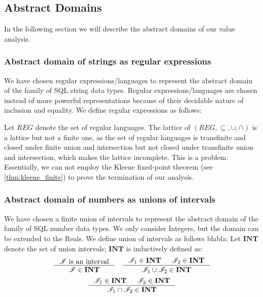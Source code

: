 \subsection{Abstract Domains}\label{subsec:abstract-domains}

In the following section we will describe the abstract domains of our value analysis.

\subsubsection{Abstract domain of strings as regular expressions}\label{subsubsec:abstract_domains_strings}
We have chosen regular expressions/languages to represent the abstract domain of the family of SQL string data types.
Regular expressions/languages are chosen instead of more powerful representations because of their decidable nature of inclusion and equality.
We define regular expressions as follows:

Let $REG$ denote the set of regular languages.
The lattice of $(REG, \subseteq, \cup, \cap)$ is a lattice but not a finite one, as the set of regular languages is transfinite and closed under finite union and intersection but not closed under transfinite union and intersection, which makes the lattice incomplete.
This is a problem: Essentially, we can not employ the Kleene fixed-point theorem (see \autoref{thm:kleene_finite}) to prove the termination of our analysis.

\subsubsection{Abstract domain of numbers as unions of intervals}\label{subsubsec:abstract_domains_numbers}
We have chosen a finite union of intervals to represent the abstract domain of the family of SQL number data types.
We only consider Integers, but the domain can be extended to the Reals.
We define union of intervals as follows blabla:
Let $\mathbf{INT}$ denote the set of union intervals; $\mathbf{INT}$ is inductively defined as:
\[
    \inference{\mathscr{I} \text{ is an interval}}{\mathscr{I} \in \mathbf{INT}} \quad
    \inference{\mathscr{I}_1 \in \textbf{INT} & \mathscr{I}_2 \in \textbf{INT}}{\mathscr{I}_1 \cup  \mathscr{I}_2 \in \mathbf{INT}}
\]
\[
    \inference{\mathscr{I}_1 \in \textbf{INT} & \mathscr{I}_2 \in \textbf{INT}}{\mathscr{I}_1 \cap  \mathscr{I}_2 \in \mathbf{INT}}
\]


